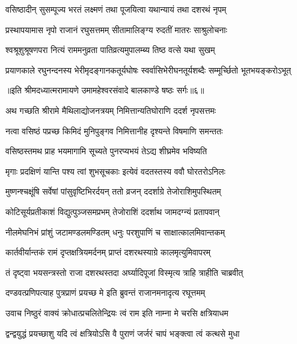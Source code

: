 \twolineshloka
{वसिष्ठादीन् सुसम्पूज्य भरतं लक्ष्मणं तथा}
{पूजयित्वा यथान्यायं तथा दशरथं नृपम्} %

\twolineshloka
{प्रस्थापयामास नृपो राजानं रघुसत्तमम्}
{सीतामालिङ्ग्य रुदतीं मातरः साश्रुलोचनाः} %

\twolineshloka
{श्वश्रूशुश्रूषणपरा नित्यं राममनुव्रता}
{पातिव्रत्यमुपालम्ब्य तिष्ठ वत्से यथा सुखम्} %

\twolineshloka
{प्रयाणकाले रघुनन्दनस्य भेरीमृदङ्गानकतूर्यघोषः}
{स्वर्वासिभेरीघनतूर्यशब्दैः सम्मूर्च्छितो भूतभयङ्करोऽभूत्} %

{॥इति श्रीमदध्यात्मरामायणे उमामहेश्वरसंवादे
बालकाण्डे षष्ठः सर्गः॥६॥
}




\twolineshloka
{अथ गच्छति श्रीरामे मैथिलाद्योजनत्रयम्}
{निमित्तान्यतिघोराणि ददर्श नृपसत्तमः} %

\twolineshloka
{नत्वा वसिष्ठं पप्रच्छ किमिदं मुनिपुङ्गव}
{निमित्तानीह दृश्यन्ते विषमाणि समन्ततः} %

\twolineshloka
{वसिष्ठस्तमथ प्राह भयमागामि सूच्यते}
{पुनरप्यभयं तेऽद्य शीघ्रमेव भविष्यति} %

\twolineshloka
{मृगाः प्रदक्षिणं यान्ति पश्य त्वां शुभसूचकाः}
{इत्येवं वदतस्तस्य ववौ घोरतरोऽनिलः} %

\twolineshloka
{मुष्णन्श्चक्षूंषि सर्वेषां पांसुवृष्टिभिरर्दयन्}
{ततो व्रजन् ददर्शाग्रे तेजोराशिमुपस्थितम्} %

\twolineshloka
{कोटिसूर्यप्रतीकाशं विद्युत्पुञ्जसमप्रभम्}
{तेजोराशिं ददर्शाथ जामदग्न्यं प्रतापवान्} %

\twolineshloka
{नीलमेघनिभं प्रांशुं जटामण्डलमण्डितम्}
{धनुः परशुपाणिं च साक्षात्कालमिवान्तकम्} %

\twolineshloka
{कार्तवीर्यान्तकं रामं दृप्तक्षत्रियमर्दनम्}
{प्राप्तं दशरथस्याग्रे कालमृत्युमिवापरम्} %

\twolineshloka
{तं दृष्ट्वा भयसन्त्रस्तो राजा दशरथस्तदा}
{अर्घ्यादिपूजां विस्मृत्य त्राहि त्राहीति चाब्रवीत्} %

\twolineshloka
{दण्डवत्प्रणिपत्याह पुत्रप्राणं प्रयच्छ मे}
{इति ब्रुवन्तं राजानमनादृत्य रघूत्तमम्} %

\twolineshloka
{उवाच निष्ठुरं वाक्यं क्रोधात्प्रचलितेन्द्रियः}
{त्वं राम इति नाम्ना मे चरसि क्षत्रियाधम} %

\twolineshloka
{द्वन्द्वयुद्धं प्रयच्छाशु यदि त्वं क्षत्रियोऽसि वै}
{पुराणं जर्जरं चापं भङ्क्त्वा त्वं कत्थसे मुधा} %

